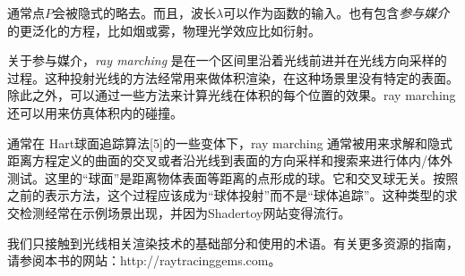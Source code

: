 \documentclass[12pt]{article}
\begin{document}
通常点$P$会被隐式的略去。而且，波长$\lambda$可以作为函数的输入。也有包含\textit{参与媒介}的更泛化的方程，比如烟或雾，物理光学效应比如衍射。

关于参与媒介，\textit{ray marching} 是在一个区间里沿着光线前进并在光线方向采样的过程。这种投射光线的方法经常用来做体积渲染，在这种场景里没有特定的表面。除此之外，可以通过一些方法来计算光线在体积的每个位置的效果。ray marching还可以用来仿真体积内的碰撞。

通常在 Hart球面追踪算法[5]的一些变体下，ray marching 通常被用来求解和隐式距离方程定义的曲面的交叉或者沿光线到表面的方向采样和搜索来进行体内/体外测试。这里的“球面”是距离物体表面等距离的点形成的球。它和交叉球无关。按照之前的表示方法，这个过程应该成为“球体投射”而不是“球体追踪”。这种类型的求交检测经常在示例场景出现，并因为Shadertoy网站变得流行。

我们只接触到光线相关渲染技术的基础部分和使用的术语。有关更多资源的指南，请参阅本书的网站：http://raytracinggems.com。
 
\end{document}
